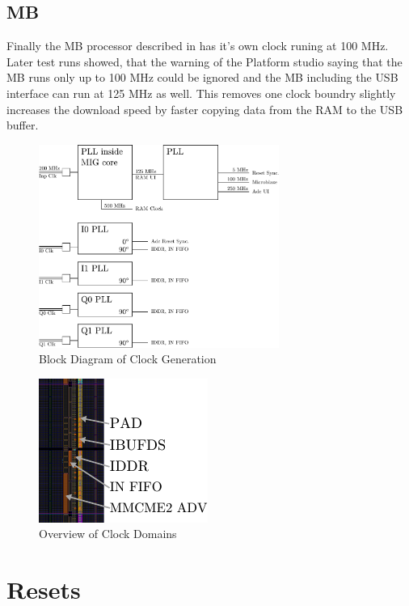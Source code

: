 \subsection{\gls{MB}}
Finally the \gls{MB} processor described in  has
it's own clock runing at 100 MHz.  \\

Later test runs showed, that the warning of the Platform studio saying that the
\gls{MB} runs only up to 100 MHz could be ignored and the \gls{MB} including
the \gls{USB} interface can run at 125 MHz as well. This removes one clock boundry
slightly increases the download speed by faster copying data from the
\gls{RAM} to the \gls{USB} buffer.

\begin{figure}
  \centering
  \includegraphics[width=0.7\textwidth]{figures/clock_generation}
  \caption{Block Diagram of Clock Generation}
  \label{fig:fpga_clock_domains}
\end{figure}

\begin{figure}
  \centering
  \includegraphics{figures/adc_input_bank}
  \caption{Overview of Clock Domains}
  \label{fig:fpga_clock_domains}
\end{figure}

\section{Resets}
\label{sec:fpga_reset}

